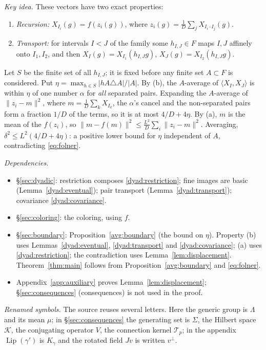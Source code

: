 \documentclass[11pt]{article}
\newcommand{\norm}[1]{\lVert #1\rVert}
\newcommand{\ip}[2]{\langle #1,#2\rangle}
\DeclareMathOperator{\Lip}{Lip}
\theoremstyle{definition}
\numberwithin{equation}{section}
\begin{document}
\emph{Key idea.} These vectors have two exact properties:
\begin{enumerate}[label=(\alph*)]
\item \emph{Recursion:} $X_{I_i}(g)=f(z_i(g))$, where
$z_i(g)=\frac1D\sum_jX_{I_i\cdot I_j}(g)$.
\item \emph{Transport:} for intervals $I<J$ of the family some
$h_{I,J}\in F$ maps $I,J$ affinely onto $I_1,I_2$, and then
$X_I(g)=X_{I_1}(h_{I,J}g)$, $X_J(g)=X_{I_2}(h_{I,J}g)$.
\end{enumerate}
Let $S$ be the finite set of all $h_{I,J}$; it is fixed before any
finite set $A\subset F$ is considered. Put
$\eta=\max_{h\in S}|hA\triangle A|/|A|$. By (b), the $A$-average of
$\ip{X_I}{X_J}$ is within $\eta$ of one number $\alpha$ for \emph{all}
separated pairs. Expanding the $A$-average of $\norm{z_i-m}^2$, where
$m=\frac1D\sum_kX_{I_k}$, the $\alpha$'s cancel and the non-separated
pairs form a fraction $1/D$ of the terms, so it is at most $4/D+4\eta$.
By (a), $m$ is the mean of the $f(z_i)$, so $\norm{m-f(m)}^2\le
\frac{L^2}D\sum_i\norm{z_i-m}^2$. Averaging,
$\delta^2\le L^2(4/D+4\eta)$: a positive lower bound for $\eta$
independent of $A$, contradicting \eqref{eq:folner}.

\emph{Dependencies.}
\begin{itemize}
\item \S\ref{sec:dyadic}: restriction composes \eqref{dyad:restriction};
fine images are basic (Lemma~\ref{dyad:eventual}); pair transport
(Lemma~\ref{dyad:transport}); covariance \eqref{dyad:covariance}.
\item \S\ref{sec:coloring}: the coloring, using $f$.
\item \S\ref{sec:boundary}: Proposition~\ref{avg:boundary} (the bound on
$\eta$). Property (b) uses Lemmas~\ref{dyad:eventual},
\ref{dyad:transport} and \eqref{dyad:covariance}; (a) uses
\eqref{dyad:restriction}; the contradiction uses
Lemma~\ref{lem:displacement}.
Theorem~\ref{thm:main} follows from Proposition~\ref{avg:boundary} and
\eqref{eq:folner}.
\item Appendix~\ref{app:auxiliary} proves Lemma~\ref{lem:displacement};
\S\ref{sec:consequences} (consequences) is not used in the proof.
\end{itemize}

\emph{Renamed symbols.} The source reuses several letters. Here the
generic group is $\Lambda$ and its mean $\mu$; in
\S\ref{sec:consequences} the generating set is $\Sigma$, the Hilbert
space $\mathcal K$, the conjugating operator $V$, the connection kernel
$\mathcal T_p$; in the appendix $\Lip(\gamma')$ is $K_\gamma$ and the
rotated field $Jv$ is written $v^\perp$.
\end{document}
